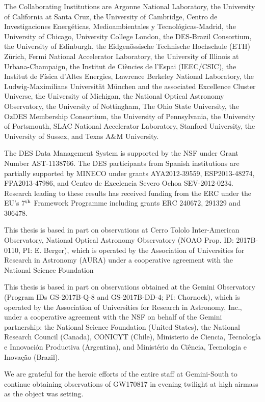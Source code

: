The Collaborating Institutions are Argonne National Laboratory, the University of California at Santa Cruz, the University of Cambridge, Centro de Investigaciones Energ{\'e}ticas, Medioambientales y Tecnol{\'o}gicas-Madrid, the University of Chicago, University College London, the DES-Brazil Consortium, the University of Edinburgh, the Eidgen{\"o}ssische Technische Hochschule (ETH) Z{\"u}rich,  Fermi National Accelerator Laboratory, the University of Illinois at Urbana-Champaign, the Institut de Ci{\`e}ncies de l'Espai (IEEC/CSIC), the Institut de F{\'i}sica d'Altes Energies, Lawrence Berkeley National Laboratory, the Ludwig-Maximilians Universit{\"a}t M{\"u}nchen and the associated Excellence Cluster Universe, the University of Michigan, the National Optical Astronomy Observatory, the University of Nottingham, The Ohio State University, the OzDES Membership Consortium, the University of Pennsylvania, the University of Portsmouth, SLAC National Accelerator Laboratory, Stanford University, the University of Sussex, and Texas A\&M University.

The DES Data Management System is supported by the NSF under Grant Number AST-1138766. The DES participants from Spanish institutions are partially supported by MINECO under grants AYA2012-39559, ESP2013-48274, FPA2013-47986, and Centro de Excelencia Severo Ochoa SEV-2012-0234. Research leading to these results has received funding from the ERC under the EU's 7$^{\rm th}$ Framework Programme including grants ERC 240672, 291329 and 306478.

This thesis is based in part on observations at Cerro Tololo Inter-American Observatory, National Optical Astronomy Observatory (NOAO Prop. ID: 2017B-0110, PI: E. Berger), which is operated by the Association of Universities for Research in Astronomy (AURA) under a cooperative agreement with the National Science Foundation

This thesis is based in part on observations obtained at the Gemini Observatory (Program IDs GS-2017B-Q-8 and GS-2017B-DD-4; PI: Chornock), which is operated by the Association of Universities for Research in Astronomy, Inc., under a cooperative agreement with the NSF on behalf of the Gemini partnership: the National Science Foundation (United States), the National Research Council (Canada), CONICYT (Chile), Ministerio de Ciencia, Tecnolog\'{i}a e Innovaci\'{o}n Productiva (Argentina), and Minist\'{e}rio da Ci\^{e}ncia, Tecnologia e Inova\c{c}\~{a}o (Brazil).

We are grateful for the heroic efforts of the entire staff at Gemini-South to continue obtaining observations of GW170817 in evening twilight at high airmass as the object was setting.
